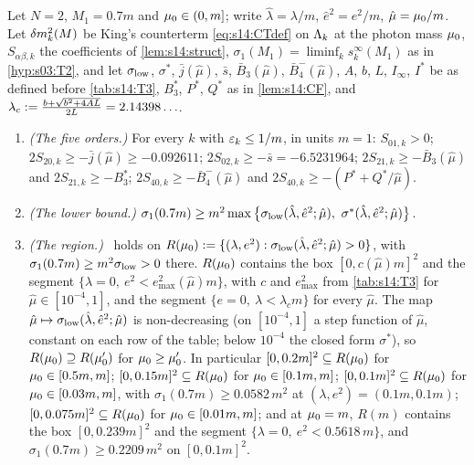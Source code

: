 \begin{proposition}\label{prop:s14:T3}
Let $N=2$, $M_1=0.7m$ and $\mu_0\in(0,m]$; write $\hat\lambda=\lambda/m$, $\hat e^2=e^2/m$, $\hat\mu=\mu_0/m$. Let $\delta m^2_k(M)$ be King's counterterm \eqref{eq:s14:CTdef} on $\Lambda_k$ at the photon mass $\mu_0$, $S_{\alpha\beta,k}$ the coefficients of \cref{lem:s14:struct}, $\sigma_1(M_1)=\liminf_ks^\infty_k(M_1)$ as in \cref{hyp:s03:T2}, and let $\sigma_{\rm low}$, $\sigma^*$, $\bar j(\hat\mu)$, $\bar s$, $\bar B_3(\hat\mu)$, $\bar B_4^-(\hat\mu)$, $A$, $b$, $L$, $I_\infty$, $I^*$ be as defined before \cref{tab:s14:T3}, $B_3^*$, $P^*$, $Q^*$ as in \cref{lem:s14:CF}, and $\lambda_c:=\frac{b+\sqrt{b^2+4AL}}{2L}=2.14398\ldots$.
\begin{enumerate}[label=\textup{(\roman*)},leftmargin=*]
\item \emph{(The five orders.)} For every $k$ with $\varepsilon_k\le1/m$, in units $m=1$: $S_{01,k}>0$; $2S_{20,k}\ge-\bar j(\hat\mu)\ge-0.092611$; $2S_{02,k}\ge-\bar s=-6.5231964$; $2S_{21,k}\ge-\bar B_3(\hat\mu)$ and $2S_{21,k}\ge-B_3^*$; $2S_{40,k}\ge-\bar B_4^-(\hat\mu)$ and $2S_{40,k}\ge-(P^*+Q^*/\hat\mu)$.
\item \emph{(The lower bound.)} $\sigma_1(0.7m)\ge m^2\max\big\{\sigma_{\rm low}(\hat\lambda,\hat e^2;\hat\mu),\ \sigma^*(\hat\lambda,\hat e^2;\hat\mu)\big\}$.
\item \emph{(The region.)} \Tthree\ holds on $R(\mu_0):=\{(\lambda,e^2):\sigma_{\rm low}(\hat\lambda,\hat e^2;\hat\mu)>0\}$, with $\sigma_1(0.7m)\ge m^2\sigma_{\rm low}>0$ there. $R(\mu_0)$ contains the box $[0,c(\hat\mu)m]^2$ and the segment $\{\lambda=0,\ e^2<e^2_{\max}(\hat\mu)m\}$, with $c$ and $e^2_{\max}$ from \cref{tab:s14:T3} for $\hat\mu\in[10^{-4},1]$, and the segment $\{e=0,\ \lambda<\lambda_cm\}$ for every $\hat\mu$. The map $\hat\mu\mapsto\sigma_{\rm low}(\hat\lambda,\hat e^2;\hat\mu)$ is non-decreasing (on $[10^{-4},1]$ a step function of $\hat\mu$, constant on each row of the table; below $10^{-4}$ the closed form $\sigma^*$), so $R(\mu_0)\supseteq R(\mu_0')$ for $\mu_0\ge\mu_0'$. In particular $[0,0.2m]^2\subseteq R(\mu_0)$ for $\mu_0\in[0.5m,m]$; $[0,0.15m]^2\subseteq R(\mu_0)$ for $\mu_0\in[0.1m,m]$; $[0,0.1m]^2\subseteq R(\mu_0)$ for $\mu_0\in[0.03m,m]$, with $\sigma_1(0.7m)\ge0.0582\,m^2$ at $(\lambda,e^2)=(0.1m,0.1m)$; $[0,0.075m]^2\subseteq R(\mu_0)$ for $\mu_0\in[0.01m,m]$; and at $\mu_0=m$, $R(m)$ contains the box $[0,0.239m]^2$ and the segment $\{\lambda=0,\ e^2<0.5618\,m\}$, and $\sigma_1(0.7m)\ge0.2209\,m^2$ on $[0,0.1m]^2$.

\end{enumerate}
\end{proposition}
